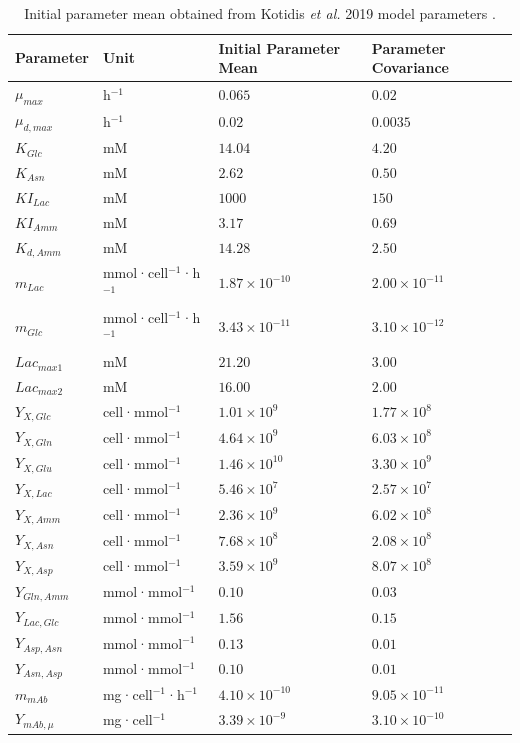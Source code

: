 
\label{para_cov}
\begin{table}[ht]
\centering
\renewcommand{\arraystretch}{1.3}
\setlength{\tabcolsep}{10pt}
\caption{Mean parameter values and ensemble covariances used for EnKF initialization.}
\caption*{Initial parameter mean obtained from Kotidis \textit{et al.} 2019 model parameters \cite{Kotidis2019Model-basedCulture}.}
\vspace{2mm}
\begin{tabular}{|l|p{2.4cm}|p{4cm}|p{4cm}|}
\hline
\textbf{Parameter} & \textbf{Unit} & \textbf{Initial Parameter Mean} & \textbf{Parameter Covariance} \\
\hline
$\mu_{max}$ & h$^{-1}$ & $0.065$ & $0.02$ \\
$\mu_{d,max}$ & h$^{-1}$ & $0.02$ & $0.0035$ \\
$K_{Glc}$ & mM & $14.04$ & $4.20$ \\
$K_{Asn}$ & mM & $2.62$ & $0.50$ \\
$KI_{Lac}$ & mM & $1000$ & $150$ \\
$KI_{Amm}$ & mM & $3.17$ & $0.69$ \\
$K_{d,Amm}$ & mM & $14.28$ & $2.50$ \\
$m_{Lac}$ & mmol·cell$^{-1}$·h$^{-1}$ & $1.87 \times 10^{-10}$ & $2.00 \times 10^{-11}$ \\
$m_{Glc}$ & mmol·cell$^{-1}$·h$^{-1}$ & $3.43 \times 10^{-11}$ & $3.10 \times 10^{-12}$ \\
$Lac_{max1}$ & mM & $21.20$ & $3.00$ \\
$Lac_{max2}$ & mM & $16.00$ & $2.00$ \\
$Y_{X,Glc}$ & cell·mmol$^{-1}$ & $1.01 \times 10^9$ & $1.77 \times 10^8$ \\
$Y_{X,Gln}$ & cell·mmol$^{-1}$ & $4.64 \times 10^9$ & $6.03 \times 10^8$ \\
$Y_{X,Glu}$ & cell·mmol$^{-1}$ & $1.46 \times 10^{10}$ & $3.30 \times 10^9$ \\
$Y_{X,Lac}$ & cell·mmol$^{-1}$ & $5.46 \times 10^7$ & $2.57 \times 10^7$ \\
$Y_{X,Amm}$ & cell·mmol$^{-1}$ & $2.36 \times 10^9$ & $6.02 \times 10^8$ \\
$Y_{X,Asn}$ & cell·mmol$^{-1}$ & $7.68 \times 10^8$ & $2.08 \times 10^8$ \\
$Y_{X,Asp}$ & cell·mmol$^{-1}$ & $3.59 \times 10^9$ & $8.07 \times 10^8$ \\
$Y_{Gln,Amm}$ & mmol·mmol$^{-1}$ & $0.10$ & $0.03$ \\
$Y_{Lac,Glc}$ & mmol·mmol$^{-1}$ & $1.56$ & $0.15$ \\
$Y_{Asp,Asn}$ & mmol·mmol$^{-1}$ & $0.13$ & $0.01$ \\
$Y_{Asn,Asp}$ & mmol·mmol$^{-1}$ & $0.10$ & $0.01$ \\
$m_{mAb}$ & mg·cell$^{-1}$·h$^{-1}$ & $4.10 \times 10^{-10}$ & $9.05 \times 10^{-11}$ \\
$Y_{mAb,\mu}$ & mg·cell$^{-1}$ & $3.39 \times 10^{-9}$ & $3.10 \times 10^{-10}$ \\
\hline
\end{tabular}
\label{tab:enkf_param_mean_cov}
\end{table}


\newpage